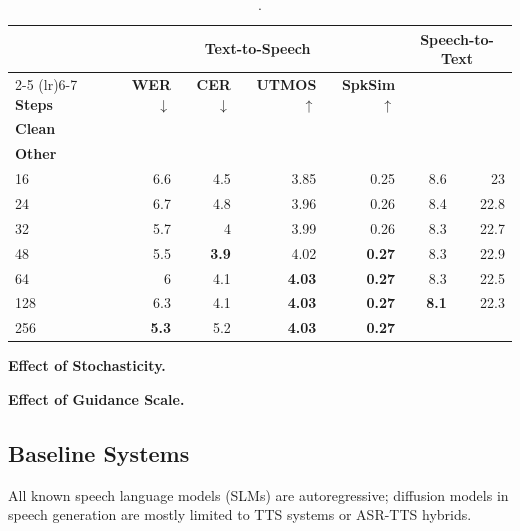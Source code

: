 \begin{table}[t]
\centering
\small
\setlength{\tabcolsep}{4.5pt}
\begin{tabular}{lrrrrrr}
\toprule
& \multicolumn{4}{c}{\textbf{Text-to-Speech}} & \multicolumn{2}{c}{\textbf{Speech-to-Text}} \\
\cmidrule(lr){2-5} \cmidrule(lr){6-7}
\textbf{Steps} & \textbf{WER}$\downarrow$ & \textbf{CER}$\downarrow$ & \textbf{UTMOS}$\uparrow$ & \textbf{SpkSim}$\uparrow$ & \makecell{\textbf{WER}$\downarrow$ \\ \textbf{Clean}} & \makecell{\textbf{WER}$\downarrow$ \\ \textbf{Other}} \\
\midrule
16 & 6.6 & 4.5 & 3.85 & 0.25 & 8.6 & 23 \\
24 & 6.7 & 4.8 & 3.96 & 0.26 & 8.4 & 22.8 \\
32 & 5.7 & 4 & 3.99 & 0.26 & 8.3 & 22.7 \\
48 & 5.5 & \textbf{3.9} & 4.02 & \textbf{0.27} & 8.3 & 22.9 \\
64 & 6 & 4.1 & \textbf{4.03} & \textbf{0.27} & 8.3 & 22.5 \\
128 & 6.3 & 4.1 & \textbf{4.03} & \textbf{0.27} & \textbf{8.1} & 22.3 \\
256 & \textbf{5.3} & 5.2 & \textbf{4.03} & \textbf{0.27}
\bottomrule
\end{tabular}
\caption{.}
\label{tab:audio:steps:cross-modal}
\end{table}

\textbf{Effect of Stochasticity.}

\textbf{Effect of Guidance Scale.}

\subsection{Baseline Systems} \label{app:audio:baselines}

All known speech language models (SLMs) are autoregressive; diffusion models in speech generation are mostly limited to TTS systems or ASR-TTS hybrids. 

